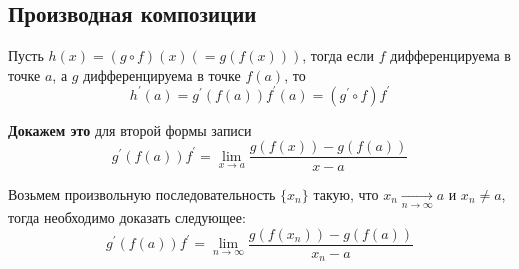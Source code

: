 \documentclass[class=article,a4paper,12pt,crop=false]{standalone}
\begin{document}
\subsection{Производная композиции}

Пусть $h(x) = (g\circ{f})(x) (= g(f(x)))$, тогда если $f$ дифференцируема в точке $a$,
а $g$ дифференцируема в точке $f(a)$, то
\begin{equation}
    h^{'}(a) = g^{'}(f(a))f^{'}(a) = (g^{'}\circ{f})f^{'}
\end{equation}

\textbf{Докажем это} для второй формы записи
\begin{equation}
    g^{'}(f(a))f^{'} = \lim\limits_{x \rightarrow a}\frac{g(f(x)) - g(f(a))}{x - a}
\end{equation}

Возьмем произвольную последовательность $\{x_n\}$ такую, что $x_n \underset{n\rightarrow \infty}{\longrightarrow} a$ и $x_n \neq a$,
тогда необходимо доказать следующее:
\begin{equation}
    g^{'}(f(a))f^{'} = \lim\limits_{n \rightarrow \infty}\frac{g(f(x_n)) - g(f(a))}{x_n - a}
\end{equation}
\end{document}
